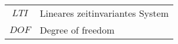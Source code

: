 
\begin{tabular}{cp{}}

  $LTI$ & Lineares zeitinvariantes System \\
  $DOF$ & Degree of freedom


\end{tabular}\\